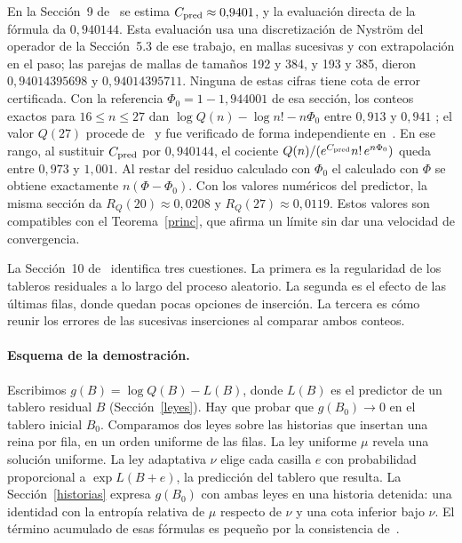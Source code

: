 En la Sección~9 de~\cite{pred} se estima $C_{\rm pred}\approx0{,}9401$, y la evaluación directa de
la fórmula da $0{,}940144$. Esta evaluación \cite[Sección~9, «Evaluación directa de la
fórmula»]{pred} usa una discretización de Nyström del operador de la Sección~5.3 de ese trabajo, en
mallas sucesivas y con extrapolación en el paso; las parejas de mallas de tamaños 192 y 384, y 193
y 385, dieron $0{,}94014395698$ y $0{,}94014395711$. Ninguna de estas cifras tiene cota de error
certificada. Con la
referencia $\Phi_0=1-1{,}944001$ de esa sección, los conteos exactos para $16\le n\le27$
\cite{oeis} dan $\log Q(n)-\log n!-n\Phi_0$ entre $0{,}913$ y $0{,}941$ \cite[Tabla~2]{pred}; el
valor $Q(27)$ procede de~\cite{q27} y fue verificado de forma independiente en~\cite{yaoli}. En
ese rango, al sustituir $C_{\rm pred}$ por $0{,}940144$, el cociente
$Q(n)/(e^{C_{\rm pred}}n!\,e^{n\Phi_0})$ queda entre $0{,}973$ y $1{,}001$. Al restar del residuo
calculado con $\Phi_0$ el calculado con $\Phi$ se obtiene exactamente $n(\Phi-\Phi_0)$. Con los
valores numéricos
del predictor, la misma sección da $R_Q(20)\approx0{,}0208$ y $R_Q(27)\approx0{,}0119$.
Estos valores son compatibles con el Teorema~\ref{princ}, que afirma un límite sin dar una velocidad
de convergencia.

La Sección~10 de~\cite{pred} identifica tres cuestiones. La primera es la regularidad de
los tableros residuales a lo largo del proceso aleatorio. La segunda es el efecto de las
últimas filas, donde quedan pocas opciones de inserción. La tercera es cómo reunir los errores
de las sucesivas inserciones al comparar ambos conteos.

\paragraph{Esquema de la demostración.}
Escribimos $g(B)=\log Q(B)-L(B)$, donde $L(B)$ es el predictor de un tablero residual $B$
(Sección~\ref{leyes}). Hay que probar que $g(B_0)\to0$ en el tablero inicial $B_0$. Comparamos dos
leyes sobre las historias que insertan una reina por fila, en un orden uniforme de las filas. La ley
uniforme $\mu$ revela una solución uniforme. La ley adaptativa $\nu$ elige cada casilla $e$ con
probabilidad proporcional a $\exp L(B+e)$, la predicción del tablero que resulta. La
Sección~\ref{historias} expresa $g(B_0)$ con ambas leyes en una historia detenida: una identidad con
la entropía relativa de $\mu$ respecto de $\nu$ y una cota inferior bajo $\nu$. El término acumulado
de esas fórmulas es pequeño por la consistencia de~\cite{pred}.

